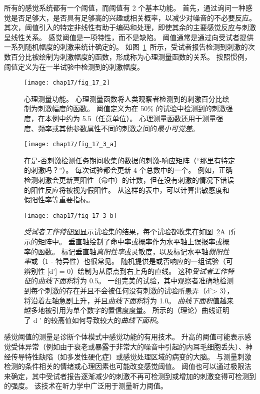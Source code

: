 所有的感觉系统都有一个阈值，而阈值有 2 个基本功能。
首先，通过询问一种感觉是否足够大，是否具有足够高的兴趣或相关概率，以减少对噪音的不必要反应。
其次，阈值引入的特定非线性有助于编码和处理，即使其余的主要感觉反应与刺激呈线性关系。
感觉阈值是一项特性，而不是缺陷。 
阈值通常是通过向受试者提供一系列随机幅度的刺激来统计确定的。
如图~\ref{fig:17_2}~所示，受试者报告检测到刺激的次数百分比被绘制为刺激幅度的函数，形成称为心理测量函数的关系。
按照惯例，阈值定义为在一半试验中检测到的刺激幅度。


\begin{figure}[htbp]
	\centering
	\texttt{[image: chap17/fig\_17\_2]}
	\caption{心理测量功能。
		心理测量函数将人类观察者检测到的刺激百分比绘制为刺激幅度的函数。 
		阈值定义为在 50\% 的试验中检测到的刺激强度，在本例中约为 5.5（任意单位）。 
		心理测量函数还用于测量强度、频率或其他参数属性不同的刺激之间的\textit{最小可觉差}。}
	\label{fig:17_2}
\end{figure}


\begin{figure}[htbp]
	\centering
	\texttt{[image: chap17/fig\_17\_3\_a]}
	\caption{在是-否刺激检测任务期间收集的数据的刺激-响应矩阵（“那里有特定的刺激吗？”）。
		每次试验都会更新 4 个总数中的一个。
		例如，正确检测刺激会更新真阳性（命中）的计数，但在没有刺激的情况下错误的阳性反应将被视为假阳性。
		从这样的表中，可以计算出敏感度和假阳性率等重要指标。}
	\label{fig:17_3_a}
\end{figure}


\begin{figure}[htbp]
	\centering
	\texttt{[image: chap17/fig\_17\_3\_b]}
	\caption{\textit{受试者工作特征}图显示试验集的结果，每个试验都收集在如图~\ref{fig:17_3_a}A~所示的矩阵中。
		垂直轴绘制了命中率或概率作为水平轴上误报率或概率的函数。
		标记垂直轴\textit{真阳性率}或灵敏度，以及标记水平轴\textit{假阳性率}或（1 - 特异性）也很常见。
		随机提供是或否响应的一组试验（可辨别性 [d'] = 0）绘制为从原点到右上角的直线。
		这种\textit{受试者工作特征}的\textit{曲线下面积}将为 0.5。
		一组完美的试验，其中观察者准确地检测到每个刺激的存在并且不会被任何没有刺激的试验所愚弄（d'> 3），将沿着左轴急剧上升，并且\textit{曲线下面积}将为 1.0。
		\textit{曲线下面积}值越来越多地被引用为单个数字的置信度度量。
		所示的（理论）曲线证明了 d ' 的较高值如何导致较大的\textit{曲线下面积}\cite{swets1973relative}。}
	\label{fig:17_3_b}
\end{figure}


感觉阈值的测量是诊断个体模式中感觉功能的有用技术。 
升高的阈值可能表示感觉受体异常（例如由于衰老或暴露于非常大的噪音中引起的内耳毛细胞丢失）、神经传导特性缺陷（如多发性硬化症）或感觉处理区域的病变的大脑。
与测量刺激检测的条件相关的情绪或心理因素也可能改变感觉阈值。
阈值也可以通过极限法来确定，其中受试者报告逐渐减少的刺激不再可检测到或增加的刺激变得可检测到的强度。
该技术在听力学中广泛用于测量听力阈值。


